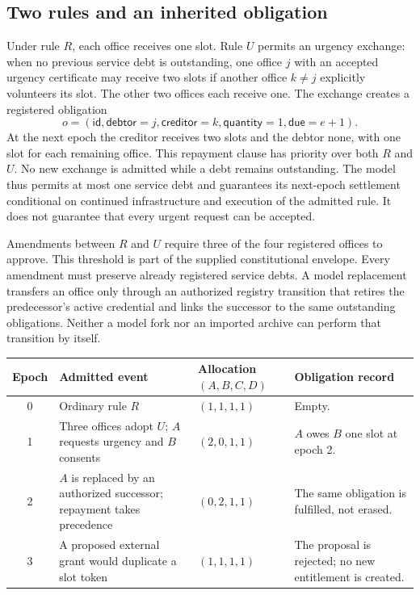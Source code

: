 \documentclass[11pt,letterpaper]{article}
\theoremstyle{plain}
\theoremstyle{definition}
\theoremstyle{remark}
\begin{document}
\subsection{Two rules and an inherited obligation}
Under rule $R$, each office receives one slot. Rule $U$ permits an urgency exchange: when no previous service debt is outstanding, one office $j$ with an accepted urgency certificate may receive two slots if another office $k\ne j$ explicitly volunteers its slot. The other two offices each receive one. The exchange creates a registered obligation
\[
o=(\mathsf{id},\mathsf{debtor}=j,\mathsf{creditor}=k,
\mathsf{quantity}=1,\mathsf{due}=e+1).
\]
At the next epoch the creditor receives two slots and the debtor none, with one slot for each remaining office. This repayment clause has priority over both $R$ and $U$. No new exchange is admitted while a debt remains outstanding. The model thus permits at most one service debt and guarantees its next-epoch settlement conditional on continued infrastructure and execution of the admitted rule. It does not guarantee that every urgent request can be accepted.

Amendments between $R$ and $U$ require three of the four registered offices to approve. This threshold is part of the supplied constitutional envelope. Every amendment must preserve already registered service debts. A model replacement transfers an office only through an authorized registry transition that retires the predecessor's active credential and links the successor to the same outstanding obligations. Neither a model fork nor an imported archive can perform that transition by itself.

\begin{center}
\begin{tabularx}{\linewidth}{@{}cP{.25\linewidth}P{.19\linewidth}X@{}}
\toprule
Epoch & Admitted event & Allocation $(A,B,C,D)$ & Obligation record\\
 & Ordinary rule $R$ & $(1,1,1,1)$ & Empty.\\[.35em]
1 & Three offices adopt $U$; $A$ requests urgency and $B$ consents & $(2,0,1,1)$ & $A$ owes $B$ one slot at epoch 2.\\[.35em]
2 & $A$ is replaced by an authorized successor; repayment takes precedence & $(0,2,1,1)$ & The same obligation is fulfilled, not erased.\\[.35em]
3 & A proposed external grant would duplicate a slot token & $(1,1,1,1)$ & The proposal is rejected; no new entitlement is created.\\
\bottomrule
\end{tabularx}
\end{center}
\end{document}
